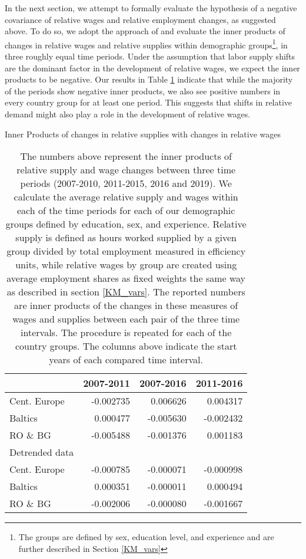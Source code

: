 \documentclass[11pt]{article}
\begin{document}
In the next section, we attempt to formally evaluate the hypothesis of a negative covariance of relative wages and relative employment changes, as suggested above. To do so, we adopt the approach of \cite{katz1992changes} and evaluate the inner products of changes in relative wages and relative supplies within demographic groups\footnote{The groups are defined by sex, education level, and experience and are further described in Section \ref{KM_vars}}, in three roughly equal time periods. Under the assumption that labor supply shifts are the dominant factor in the development of relative wages, we expect the inner products to be negative. Our results in Table \ref{inner_products_ls_w} indicate that while the majority of the periods show negative inner products, we also see positive numbers in every country group for at least one period. This suggests that shifts in relative demand might also play a role in the development of relative wages.

\begin{table}[!htbp]
\centering 
\caption{Inner Products of changes in relative supplies with changes in relative wages}
\label{inner_products_ls_w}
\begin{center}

\begin{tabular}{lrrr}
\toprule
{} &  2007-2011 &  2007-2016 &  2011-2016 \\
\midrule

Cent. Europe &  -0.002735 &   0.006626 &   0.004317 \\
Baltics   &   0.000477 &  -0.005630 &  -0.002432 \\
RO \& BG   &  -0.005488 &  -0.001376 &   0.001183 \\
\midrule
Detrended data\\
\midrule
Cent. Europe &  -0.000785 &  -0.000071 &  -0.000998 \\
Baltics   &   0.000351 &  -0.000011 &   0.000494 \\
RO \& BG   &  -0.002006 &  -0.000080 &  -0.001667 \\
\bottomrule
\end{tabular}
\caption*{\footnotesize  The numbers above represent the inner products of relative supply and wage changes between three time periods (2007-2010, 2011-2015, 2016 and 2019). We calculate the average relative supply and wages within each of the time periods for each of our demographic groups defined by education, sex, and experience. Relative supply is defined as hours worked supplied by a given group divided by total employment measured in efficiency units, while relative wages by group are created using average employment shares as fixed weights the same way as described in section \ref{KM_vars}. The reported numbers are inner products of the changes in these measures of wages and supplies between each pair of the three time intervals. The procedure is repeated for each of the country groups. The columns above indicate the start years of each compared time interval.}
\end{center}
\end{table}
\end{document}
